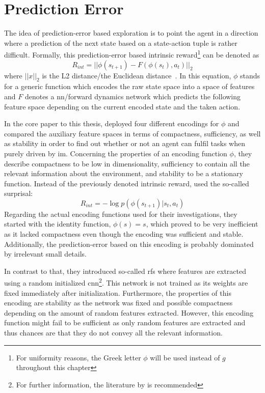 \documentclass[draft,final]{vutinfth} %
\newcommand{\p}[1]{see p. #1}
\begin{document}
    \section{Prediction Error}\label{sec:prediction-error}

    The idea of prediction-error based exploration is to point the agent in a direction where a prediction of the next state based on a state-action tuple is rather difficult.
    Formally, this prediction-error based intrinsic reward\footnote{For uniformity reasons, the Greek letter $\phi$ will be used instead of $g$ throughout this chapter} can be denoted as
    \begin{equation}
        R_{int}=||\phi(s_{t+1})-F(\phi(s_t),a_t)||_2
    \end{equation}
    where $||x||_2$ is the L2 distance/the Euclidean distance~\citep{aubret_survey_2019}.
    In this equation, $\phi$ stands for a generic function which encodes the raw state space into a space of features and $F$ denotes a \gls{nn}/forward dynamics network which predicts the following feature space depending on the current encoded state and the taken action.

    In the core paper to this thesis, \citet{burda_large-scale_2018-1} deployed four different encodings for $\phi$ and compared the auxiliary feature spaces in terms of compactness, sufficiency, as well as stability in order to find out whether or not an agent can fulfil tasks when purely driven by \gls{im}.
    Concerning the properties of an encoding function $\phi$, they describe compactness to be low in dimensionality, sufficiency to contain all the relevant information about the environment, and stability to be a stationary function.
    Instead of the previously denoted intrinsic reward, \citet{burda_large-scale_2018-1} used the so-called surprisal:
    \begin{equation}
        R_{int}=-\log p(\phi(s_{t+1})|s_t,a_t)
    \end{equation}
    Regarding the actual encoding functions used for their investigations, they started with the identity function, $\phi(s)=s$, which proved to be very inefficient as it lacked compactness even though the encoding was sufficient and stable.
    Additionally, the prediction-error based on this encoding is probably dominated by irrelevant small details.

    In contrast to that, they introduced so-called \glspl{rf} where features are extracted using a random initialized \gls{cnn}\footnote{For further information, the literature by \citet[\p{40ff}]{aggarwal_neural_2018} is recommended}.
    This network is not trained as its weights are fixed immediately after initialization.
    Furthermore, the properties of this encoding are stability as the network was fixed and possible compactness depending on the amount of random features extracted.
    However, this encoding function might fail to be sufficient as only random features are extracted and thus chances are that they do not convey all the relevant information.
\end{document}
